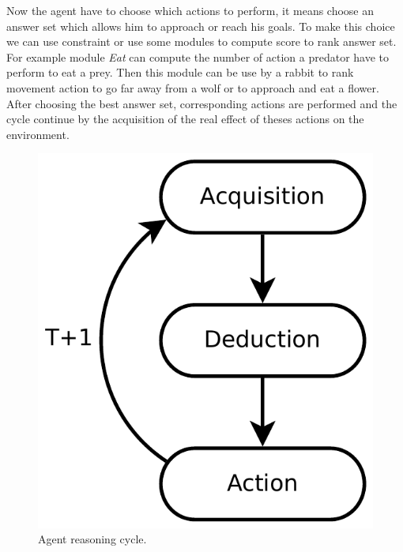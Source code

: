 \documentclass{aamas2012}
\begin{document}
	Now the agent have to choose which actions to perform, it means choose an answer set which allows him to approach or reach his goals.
	To make this choice we can use constraint or use some modules to compute score to rank answer set.
	For example module \textit{Eat} can compute the number of action a predator have to perform to eat a prey.
	Then this module can be use by a rabbit to rank movement action to go far away from a wolf or to approach and eat a flower.
	After choosing the best answer set, corresponding actions are performed and 
	the cycle continue by the acquisition of the real effect of theses actions on the environment.

	\begin{figure}
		\centering
		\includegraphics[keepaspectratio=true, scale=0.4]{framework.pdf}
		\caption
		{
			\label{framework_figure}
			Agent reasoning cycle.
		}
	\end{figure}
\end{document}

